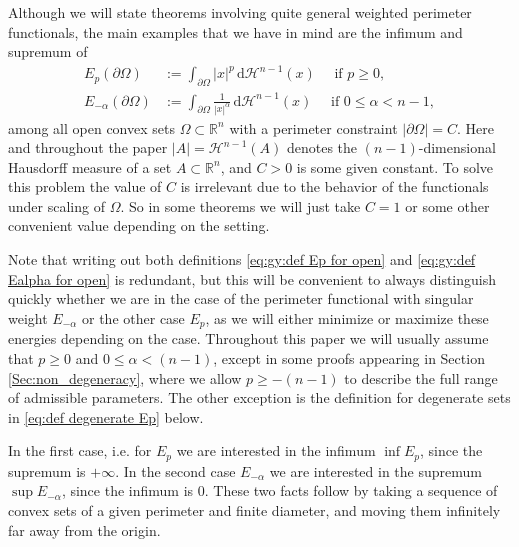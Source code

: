 \documentclass[10pt,leqno]{amsart}
\newcommand{\R}[0]{\mathbb{R}}
\newcommand{\dd}{\, \mathrm{d}}
\newcommand{\Hau}{\mathcal{H}}
\numberwithin{Theorem}{section}
\theoremstyle{definition}
\theoremstyle{remark}
\numberwithin{equation}{section}
\numberwithin{equation}{section}
\begin{document}
Although we will state theorems involving quite general weighted perimeter functionals, the main examples that we have in mind are the infimum and supremum of
\begin{align}
  \label{eq:gy:def Ep for open}
  E_p(\partial\Omega) &:= \int_{\partial\Omega}|x|^p \dd \Hau^{n-1}(x) \quad \text{ if } p\geq 0, 
  \\
  \label{eq:gy:def Ealpha for open}
  E_{-\alpha}(\partial\Omega) &:= \int_{\partial\Omega}\frac{1}{|x|^{\alpha}} \dd \Hau^{n-1}(x) \quad \text{ if } 0\leq \alpha<n-1,
\end{align}
among all open convex sets $\Omega\subset\R^n$ with a perimeter constraint $|\partial\Omega|=C$. Here and throughout the paper $|A|=\Hau^{n-1}(A)$ denotes the $(n-1)$-dimensional Hausdorff measure of a set $A\subset\R^n$, and $C>0$ is some given constant. To solve this problem the value of $C$ is irrelevant due to the behavior of the functionals under scaling of $\Omega$. So in some theorems we will just take $C=1$ or some other convenient value depending on the setting.








Note that writing out both definitions \eqref{eq:gy:def Ep for open} and \eqref{eq:gy:def Ealpha for open} is redundant, but this will be convenient to always distinguish quickly whether we are in the case of the perimeter functional with singular weight $E_{-\alpha}$ or the other case $E_p$, as we will either minimize or maximize these energies depending on the case. Throughout this paper we will usually assume that $p\geq 0$ and $0\leq\alpha<(n-1)$, except in some proofs appearing in Section \ref{Sec:non_degeneracy}, where we allow  $p\geq -(n-1)$ to describe the full range of admissible parameters.  The other exception is the definition for degenerate sets in \eqref{eq:def degenerate Ep} below. 









In the first case, i.e. for $E_p$ we are interested in the infimum $\inf E_p$, since the supremum is $+\infty$. In the second case $E_{-\alpha}$ we are interested in the supremum $\sup E_{-\alpha}$, since the infimum is $0$. These two facts follow by taking a sequence of  convex sets of a given perimeter and finite diameter, and moving them infinitely far away from the origin.
\end{document}
